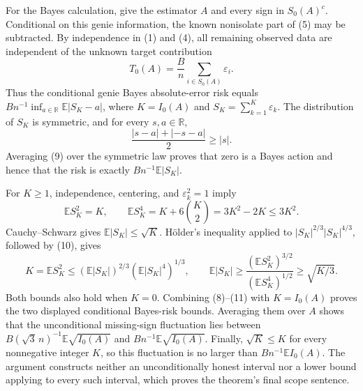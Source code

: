For the Bayes calculation, give the estimator \(A\) and every sign in \(S_0(A)^c\).  Conditional on this genie information, the known nonisolate part of (5) may be subtracted.  By independence in (1) and (4), all remaining observed data are independent of the unknown target contribution
\[
 T_0(A)=\frac{B}{n}\sum_{i\in S_0(A)}\varepsilon_i.
\tag{8}
\]
Thus the conditional genie Bayes absolute-error risk equals \(B n^{-1}\inf_{a\in\mathbb R}\mathbb E|S_K-a|\), where \(K=I_0(A)\) and \(S_K=\sum_{k=1}^K\varepsilon_k\).  The distribution of \(S_K\) is symmetric, and for every \(s,a\in\mathbb R\),
\[
 \frac{|s-a|+|-s-a|}{2}\ge |s|.
\tag{9}
\]
Averaging (9) over the symmetric law proves that zero is a Bayes action and hence that the risk is exactly \(Bn^{-1}\mathbb E|S_K|\).

For \(K\ge1\), independence, centering, and \(\varepsilon_k^2=1\) imply
\[
 \mathbb E S_K^2=K,
 \qquad
 \mathbb E S_K^4=K+6{K\choose2}=3K^2-2K\le3K^2.
\tag{10}
\]
Cauchy--Schwarz gives \(\mathbb E|S_K|\le\sqrt K\).  H\"older's inequality applied to \(|S_K|^{2/3}|S_K|^{4/3}\), followed by (10), gives
\[
 K=\mathbb E S_K^2
 \le (\mathbb E|S_K|)^{2/3}(\mathbb E|S_K|^4)^{1/3},
 \qquad
 \mathbb E|S_K|
 \ge \frac{(\mathbb E S_K^2)^{3/2}}{(\mathbb E S_K^4)^{1/2}}
 \ge\sqrt{K/3}.
\tag{11}
\]
Both bounds also hold when \(K=0\).  Combining (8)--(11) with \(K=I_0(A)\) proves the two displayed conditional Bayes-risk bounds.  Averaging them over \(A\) shows that the unconditional missing-sign fluctuation lies between \(B(\sqrt3\,n)^{-1}\mathbb E\sqrt{I_0(A)}\) and \(Bn^{-1}\mathbb E\sqrt{I_0(A)}\).  Finally, \(\sqrt K\le K\) for every nonnegative integer \(K\), so this fluctuation is no larger than \(Bn^{-1}\mathbb E I_0(A)\).  The argument constructs neither an unconditionally honest interval nor a lower bound applying to every such interval, which proves the theorem's final scope sentence.